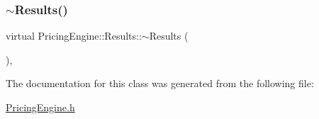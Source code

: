 \hypertarget{class_pricing_engine_1_1_results_a3a0c59acadf917438c07697f547de53e}{}\label{class_pricing_engine_1_1_results_a3a0c59acadf917438c07697f547de53e} 
\subsubsection{\texorpdfstring{$\sim$\+Results()}{~Results()}}
{\footnotesize\ttfamily virtual Pricing\+Engine\+::\+Results\+::$\sim$\+Results (\begin{DoxyParamCaption}{ }\end{DoxyParamCaption})\hspace{0.3cm}{\ttfamily [inline]}, {\ttfamily [virtual]}}



The documentation for this class was generated from the following file\+:\begin{DoxyCompactItemize}
\item 
\hyperlink{_pricing_engine_8h}{Pricing\+Engine.\+h}\end{DoxyCompactItemize}
